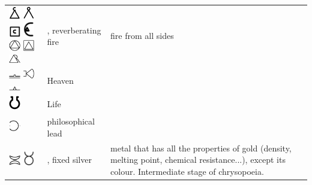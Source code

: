 \documentclass[british,final,landscape]{scrartcl}
\begin{document}
\begin{refsection}
\begin{supertabular}{p{0.3\textwidth}p{0.34\textwidth}p{0.34\textwidth}}
  \includegraphics[width=5mm]{Concepts/CirculatingFire} \includegraphics[width=5mm]{Concepts/CirculatingFire2} \includegraphics[width=5mm]{Concepts/CirculatingFire3} \includegraphics[width=5mm]{Concepts/CirculatingFire4} \includegraphics[width=5mm]{Concepts/IgnisCirculatorius} \includegraphics[width=5mm]{Concepts/IgnisCirculatorius2} \includegraphics[width=5mm]{Concepts/IgnisCirculatorius3} & , reverberating fire &  fire from all sides \\
  \includegraphics[width=5mm]{Concepts/Heaven} \includegraphics[width=5mm]{Concepts/Heaven2} \includegraphics[width=5mm]{Concepts/Heaven3} & Heaven & \\
  \includegraphics[width=5mm]{Concepts/Life} & Life & \\
  \includegraphics[width=5mm]{Concepts/LeadOfPhilosophers} &philosophical lead & \\
  \includegraphics[width=5mm]{Concepts/LunaFixa} \includegraphics[width=5mm]{Concepts/LunaFixa2} & , fixed silver & metal that has all the properties of gold (density, melting point, chemical resistance...), except its colour. Intermediate stage of chrysopoeia.  \\

\end{supertabular}
\end{refsection}
\end{document}

